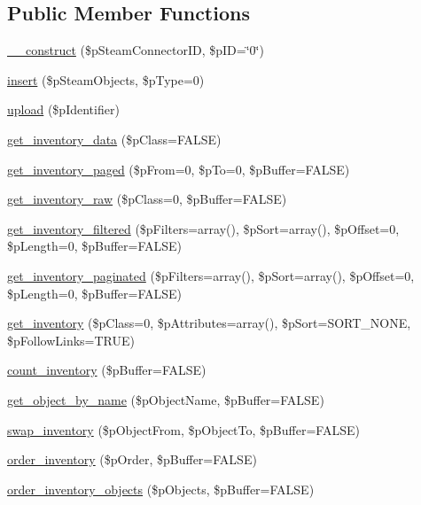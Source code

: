 \subsection*{Public Member Functions}
\begin{DoxyCompactItemize}
\item 
\hyperlink{classsteam__container_a92b0a80d09f61c3f787e4ce4da6ba4a0}{\_\-\_\-construct} (\$pSteamConnectorID, \$pID=\char`\"{}0\char`\"{})
\item 
\hyperlink{classsteam__container_a819a4301aee938c747ea3b3d6fc9c21e}{insert} (\$pSteamObjects, \$pType=0)
\item 
\hyperlink{classsteam__container_a24dc3eb756952239911224b934f02097}{upload} (\$pIdentifier)
\item 
\hyperlink{classsteam__container_afa3178d396500f4c0078c68834e5dc66}{get\_\-inventory\_\-data} (\$pClass=FALSE)
\item 
\hyperlink{classsteam__container_ace06a415bea2904d93f3ef4bcb076912}{get\_\-inventory\_\-paged} (\$pFrom=0, \$pTo=0, \$pBuffer=FALSE)
\item 
\hyperlink{classsteam__container_a17c81276057de88ee969f9002c1ed467}{get\_\-inventory\_\-raw} (\$pClass=0, \$pBuffer=FALSE)
\item 
\hyperlink{classsteam__container_aedb8096691e63b9d41370312f56b06ed}{get\_\-inventory\_\-filtered} (\$pFilters=array(), \$pSort=array(), \$pOffset=0, \$pLength=0, \$pBuffer=FALSE)
\item 
\hyperlink{classsteam__container_a09e37c91bc8122dc964ff5f5035f6dcd}{get\_\-inventory\_\-paginated} (\$pFilters=array(), \$pSort=array(), \$pOffset=0, \$pLength=0, \$pBuffer=FALSE)
\item 
\hyperlink{classsteam__container_a8698da8bb39fe0c5247f525bd413e1eb}{get\_\-inventory} (\$pClass=0, \$pAttributes=array(), \$pSort=SORT\_\-NONE, \$pFollowLinks=TRUE)
\item 
\hyperlink{classsteam__container_a5b6a08f4e74dfb19915d58bd2c414092}{count\_\-inventory} (\$pBuffer=FALSE)
\item 
\hyperlink{classsteam__container_a7367a45ee0019158e0127c7fe74fb212}{get\_\-object\_\-by\_\-name} (\$pObjectName, \$pBuffer=FALSE)
\item 
\hyperlink{classsteam__container_af534e7d4adcf6c48d6f2616afe6da458}{swap\_\-inventory} (\$pObjectFrom, \$pObjectTo, \$pBuffer=FALSE)
\item 
\hyperlink{classsteam__container_aaf4ed77cd6f21bd5b0f3a765699114e7}{order\_\-inventory} (\$pOrder, \$pBuffer=FALSE)
\item 
\hyperlink{classsteam__container_a8b6383ff371515c87b63b12dc2932359}{order\_\-inventory\_\-objects} (\$pObjects, \$pBuffer=FALSE)
\end{DoxyCompactItemize}


